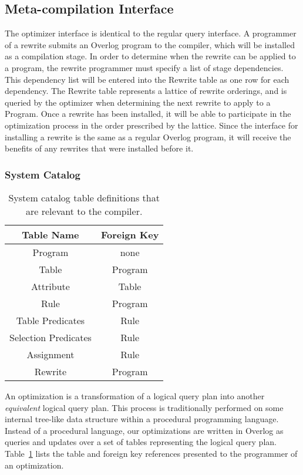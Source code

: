 \documentclass{vldb}
\begin{document}
\subsection{Meta-compilation Interface}


The optimizer interface is identical to the regular query interface. 
A programmer of a rewrite submits an Overlog program to the 
compiler, which will be installed as a compilation stage. In order
to determine when the rewrite can be applied to a program, the 
rewrite programmer must specify a list of stage dependencies.
This dependency list will be entered into the Rewrite table as one
row for each dependency. The Rewrite table represents a lattice
of rewrite orderings, and is queried by the optimizer when determining
the next rewrite to apply to a Program. Once a rewrite has been installed,
it will be able to participate in the optimization process in the order
prescribed by the lattice. Since the interface for installing a rewrite is
the same as a regular Overlog program, it will receive the benefits
of any rewrites that were installed before it. 

\subsubsection {System Catalog}

\begin{table}
\centering
\caption{System catalog table definitions that are relevant to the compiler.}
\label{tbl:systemTable}
\begin{tabular}{|c|c|} \hline
Table Name & Foreign Key \\ \hline
Program & none \\ \hline
Table & Program \\ \hline
Attribute & Table \\ \hline
Rule & Program \\ \hline
Table Predicates & Rule \\ \hline
Selection Predicates & Rule \\ \hline
Assignment & Rule \\ \hline
Rewrite & Program \\
\hline\end{tabular}
\end{table}

An optimization is a transformation of a logical query plan into 
another \emph{equivalent} logical query plan. This process is
traditionally performed on some internal tree-like data structure
within a procedural programming language. Instead of a procedural
language, our optimizations are written in Overlog as queries and
updates over a set of tables representing the logical query plan. 
Table~\ref{tbl:systemTable} lists the table and foreign key references
presented to the programmer of an optimization. 
\end{document}
